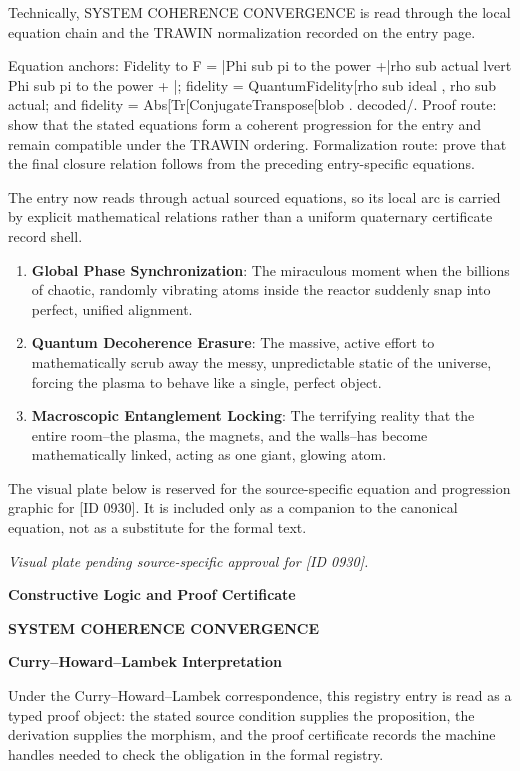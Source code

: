 Technically, SYSTEM COHERENCE CONVERGENCE is read through the local equation chain and the TRAWIN normalization recorded on the entry page.

Equation anchors: Fidelity to F = |Phi sub pi to the power +|rho sub actual lvert Phi sub pi to the power + |; fidelity = QuantumFidelity[rho sub ideal , rho sub actual; and fidelity = Abs[Tr[ConjugateTranspose[blob . decoded/. Proof route: show that the stated equations form a coherent progression for the entry and remain compatible under the TRAWIN ordering. Formalization route: prove that the final closure relation follows from the preceding entry-specific equations.

The entry now reads through actual sourced equations, so its local arc is carried by explicit mathematical relations rather than a uniform quaternary certificate record shell.
\endgroup

\begin{enumerate}[leftmargin=1.6em,itemsep=6pt,topsep=4pt]
\item \textbf{Global Phase Synchronization}: The miraculous moment when the billions of chaotic, randomly vibrating atoms inside the reactor suddenly snap into perfect, unified alignment.
\item \textbf{Quantum Decoherence Erasure}: The massive, active effort to mathematically scrub away the messy, unpredictable static of the universe, forcing the plasma to behave like a single, perfect object.
\item \textbf{Macroscopic Entanglement Locking}: The terrifying reality that the entire room--the plasma, the magnets, and the walls--has become mathematically linked, acting as one giant, glowing atom.
\end{enumerate}

\begingroup\footnotesize\sloppy
The visual plate below is reserved for the source-specific equation and progression graphic for [ID 0930]. It is included only as a companion to the canonical equation, not as a substitute for the formal text.
\par\endgroup
\begingroup\footnotesize\itshape
Visual plate pending source-specific approval for [ID 0930].
\par\endgroup

\clearpage
\begingroup\tzpsupportsetup
\noindent\textbf{\fontsize{10.8pt}{12.8pt}\selectfont [ID 0930] Constructive Logic and Proof Certificate}\par
\noindent\textbf{\fontsize{10pt}{12pt}\selectfont SYSTEM COHERENCE CONVERGENCE}\par
\vspace{0.45em}
\begingroup
\footnotesize
\setlength{\parskip}{0.22em}
\setlength{\parindent}{0pt}
\noindent\textbf{Curry--Howard--Lambek Interpretation}\par
Under the Curry--Howard--Lambek correspondence, this registry entry is read as a typed proof
object: the stated source condition supplies the proposition, the derivation supplies the
morphism, and the proof certificate records the machine handles needed to check the obligation
in the formal registry.

